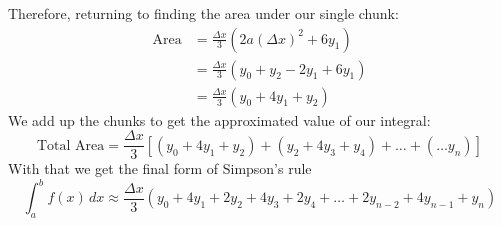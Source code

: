 \documentclass{report}
\begin{document}
Therefore, returning to finding the area under our single chunk:
\begin{align*}
\text{Area}&=\frac{\Delta x}{3}(2a(\Delta x)^2+6y_1)\\
&=\frac{\Delta x}{3}(y_0+y_2-2y_1+6y_1)\\
&=\frac{\Delta x}{3}(y_0+4y_1+y_2)
\end{align*}
We add up the chunks to get the approximated value of our integral:
\begin{equation*}
\text{Total Area}=\frac{\Delta x}{3}
[(y_0+4y_1+y_2)+(y_2+4y_3+y_4)+\ldots+(\ldots y_n)]
\end{equation*}
With that we get the final form of Simpson's rule
\begin{equation*}
\int_a^bf(x)\,dx\approx \frac{\Delta x}{3}(y_0+4y_1+2y_2
+4y_3+2y_4+\ldots+2y_{n-2}+4y_{n-1}+y_n) 
\end{equation*} 
\newpage 
\end{document}
